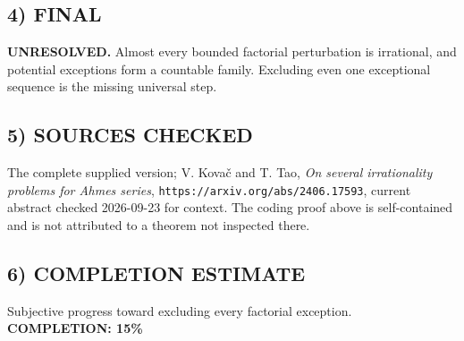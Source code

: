 \subsection*{4) FINAL}
\textbf{UNRESOLVED.} Almost every bounded factorial perturbation is irrational, and potential exceptions form a countable family. Excluding even one exceptional sequence is the missing universal step.
\subsection*{5) SOURCES CHECKED}
The complete supplied version; V. Kova\v{c} and T. Tao, \emph{On several irrationality problems for Ahmes series}, \texttt{https://arxiv.org/abs/2406.17593}, current abstract checked 2026-09-23 for context. The coding proof above is self-contained and is not attributed to a theorem not inspected there.
\subsection*{6) COMPLETION ESTIMATE}
Subjective progress toward excluding every factorial exception.
\textbf{COMPLETION: 15\%}
